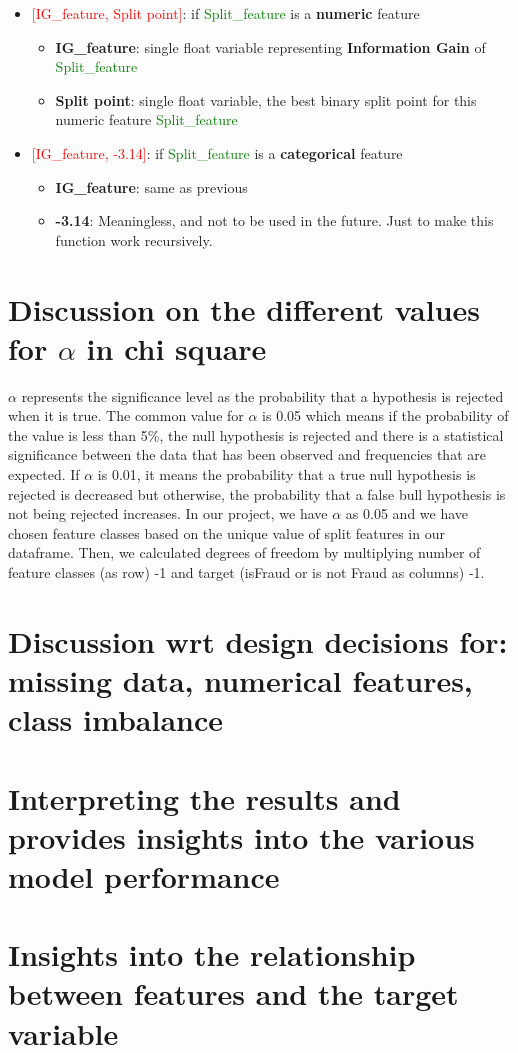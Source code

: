 \documentclass{article}
\begin{document}
\begin{itemize}
    \item \textcolor{red}{[IG\_feature, Split point]}: if \textcolor{green}{Split\_feature} is a \textbf{numeric} feature
        \begin{itemize}
            \item \textbf{IG\_feature}: single float variable representing \textbf{Information Gain} of \textcolor{green}{Split\_feature}
            \item \textbf{Split point}: single float variable, the best binary split point for this numeric feature \textcolor{green}{Split\_feature}
        \end{itemize}
    \item \textcolor{red}{[IG\_feature, -3.14]}: if \textcolor{green}{Split\_feature} is a \textbf{categorical} feature
        \begin{itemize}
            \item \textbf{IG\_feature}: same as previous
            \item \textbf{-3.14}: Meaningless, and not to be used in the future. Just to make this function work recursively.
        \end{itemize}
\end{itemize}


\section{Discussion on the different values for $\alpha$ in chi square}

$\alpha$ represents the significance level as the probability that a hypothesis is rejected when it is true. The common value for $\alpha$ is 0.05 which means if the probability of the value is less than 5\%, the null hypothesis is rejected and there is a statistical significance between the data that has been observed and frequencies that are expected. If $\alpha$ is 0.01, it means the probability that a true null hypothesis is rejected is decreased but otherwise, the probability that a false bull hypothesis is not being rejected increases. 
In our project, we have $\alpha$ as 0.05 and we have chosen feature classes based on the unique value of split features in our dataframe. Then, we calculated degrees of freedom by multiplying number of feature classes (as row) -1 and target (isFraud or is not Fraud as columns) -1. 



\section{Discussion wrt design decisions for: missing data, numerical features, class imbalance}
\section{Interpreting the results and provides insights into the various model performance}
\section{Insights into the relationship between features and the target variable}
\end{document}
